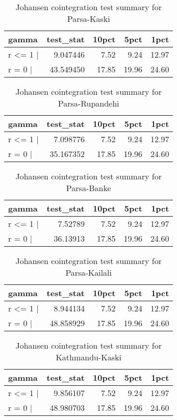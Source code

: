 \documentclass[
  12pt,
]{article}
\begin{document}
\begin{longtable}[t]{lrrrr}
\caption{\label{tab:wheat-cajo-test}Johansen cointegration test summary for Parsa-Kaski}\\
\toprule
gamma & test\_stat & 10pct & 5pct & 1pct\\
\midrule
r <= 1 | & 9.047446 & 7.52 & 9.24 & 12.97\\
r = 0  | & 43.549450 & 17.85 & 19.96 & 24.60\\
\bottomrule
\end{longtable}

\begin{longtable}[t]{lrrrr}
\caption{\label{tab:wheat-cajo-test}Johansen cointegration test summary for Parsa-Rupandehi}\\
\toprule
gamma & test\_stat & 10pct & 5pct & 1pct\\
\midrule
r <= 1 | & 7.098776 & 7.52 & 9.24 & 12.97\\
r = 0  | & 35.167352 & 17.85 & 19.96 & 24.60\\
\bottomrule
\end{longtable}

\begin{longtable}[t]{lrrrr}
\caption{\label{tab:wheat-cajo-test}Johansen cointegration test summary for Parsa-Banke}\\
\toprule
gamma & test\_stat & 10pct & 5pct & 1pct\\
\midrule
r <= 1 | & 7.52789 & 7.52 & 9.24 & 12.97\\
r = 0  | & 36.13913 & 17.85 & 19.96 & 24.60\\
\bottomrule
\end{longtable}

\begin{longtable}[t]{lrrrr}
\caption{\label{tab:wheat-cajo-test}Johansen cointegration test summary for Parsa-Kailali}\\
\toprule
gamma & test\_stat & 10pct & 5pct & 1pct\\
\midrule
r <= 1 | & 8.944134 & 7.52 & 9.24 & 12.97\\
r = 0  | & 48.858929 & 17.85 & 19.96 & 24.60\\
\bottomrule
\end{longtable}

\begin{longtable}[t]{lrrrr}
\caption{\label{tab:wheat-cajo-test}Johansen cointegration test summary for Kathmandu-Kaski}\\
\toprule
gamma & test\_stat & 10pct & 5pct & 1pct\\
\midrule
r <= 1 | & 9.856107 & 7.52 & 9.24 & 12.97\\
r = 0  | & 48.980703 & 17.85 & 19.96 & 24.60\\
\bottomrule
\end{longtable}
\end{document}

